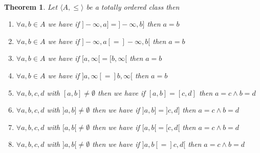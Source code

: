\documentclass{book}
\newtheorem{theorem}{Theorem}
\begin{document}
\

\begin{theorem}
  \label{generalized intervals and boundaries}Let $\langle A, \leqslant
  \rangle$ be a totally ordered class then
  \begin{enumerate}
    \item $\forall a, b \in A$ we have if $] - \infty, a] =] - \infty, b]$
    then $a = b$
    
    \item $\forall a, b \in A$ we have if $] - \infty, a [=] - \infty, b [$
    then $a = b$
    
    \item $\forall a, b \in A$ we have if $[a, \infty [= [b, \infty [$ then $a
    = b$
    
    \item $\forall a, b \in A$ we have if $] a, \infty [=] b, \infty [$ then
    $a = b$
    
    \item $\forall a, b, c, d$ with $[a, b] \neq \emptyset$ then we have if
    $[a, b] = [c, d]$ then $a = c \wedge b = d$
    
    \item $\forall a, b, c, d$ with $] a, b] \neq \emptyset$ then we have if
    $] a, b] =] c, d]$ then $a = c \wedge b = d$
    
    \item $\forall a, b, c, d$ with $[a, b [\neq \emptyset$ then we have if
    $[a, b [= [c, d [$ then $a = c \wedge b = d$
    
    \item $\forall a, b, c, d$ with $] a, b [\neq \emptyset$ then we have if
    $] a, b [=] c, d [$ then $a = c \wedge b = d$
  \end{enumerate}
\end{theorem}
\end{document}
